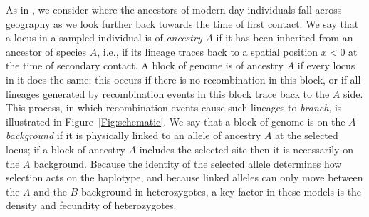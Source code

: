 \documentclass[11pt,letterpaper]{article}
\begin{document}
As in \citet{sedghifar2015spatial}, we consider where the ancestors of modern-day individuals
fall across geography as we look further back towards the time of first contact.  
We say that a locus in a sampled individual is of \emph{ancestry} $A$ if it has been inherited from an ancestor of species $A$,
i.e., if its lineage traces back to a spatial position $x<0$  at the time of secondary contact.
A block of genome is of ancestry $A$ if every locus in it does the same; 
	this occurs if there is no recombination in this block, or if all lineages generated by recombination events 
	in this block trace back to the $A$ side. 
This process, in which recombination events cause such lineages to \emph{branch},
is illustrated in Figure~\ref{Fig:schematic}.
We say that a block of genome is on the $A$ \emph{background} if it is physically linked to an allele of ancestry $A$ at the selected locus;
if a block of ancestry $A$ includes the selected site then it is necessarily on the $A$ background.
Because the identity of the selected allele determines how selection acts on the haplotype,
and because linked alleles can only move between the $A$ and the $B$ background in heterozygotes, 
a key factor in these models is the density and fecundity of heterozygotes.
\end{document}
